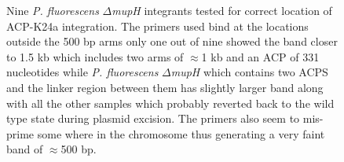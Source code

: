 		\setlength\fboxsep{5pt}
		\setlength\fboxrule{1.5pt}
		\begin{figure}[htbp]
		\centering
		\caption[Nine \textit{P. fluorescens} $ \Delta $\textit{mupH} integrants tested for correct location of ACP-K24a integration.]{Nine \textit{P. fluorescens} $ \Delta $\textit{mupH} integrants tested for correct location of ACP-K24a integration. The primers used bind at the locations outside the 500 bp arms only one out of nine showed the band closer to 1.5 kb which includes two arms of $ \approx $1 kb and an ACP of 331 nucleotides while \textit{P. fluorescens} $ \Delta $\textit{mupH} which contains two ACPS and the linker region between them has slightly larger band along with all the other samples which probably reverted back to the wild type state during plasmid excision. The primers also seem to mis-prime some where in the chromosome thus generating a very faint band of $ \approx $500 bp.}
		\label{fig:deltahexcisants}
		\end{figure}

